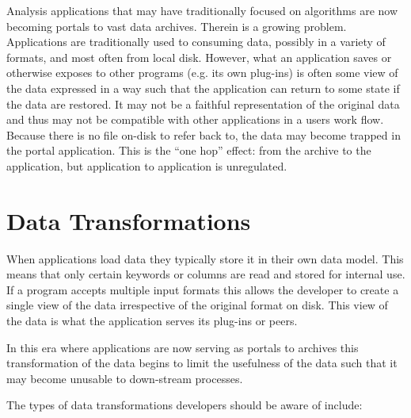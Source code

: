 Analysis applications that may have traditionally focused on algorithms are now becoming portals to vast data archives.  Therein is a growing problem.  Applications are traditionally used to consuming data, possibly in a variety of formats, and most often from local disk.  However, what an application saves or otherwise exposes to other programs (e.g. its own plug-ins) is often some view of the data expressed in a way such that the application can return to some state if the data are restored.  It may not be a faithful representation of the original data and thus may not be compatible with other applications in a users work flow.  Because there is no file on-disk to refer back to, the data may become trapped in the portal application.  This is the ``one hop'' effect:  from the archive to the application, but application to application is unregulated.


\section{Data Transformations}

When applications load data they typically store it in their own data model. This means that only certain keywords or columns are read and stored for internal use.  If a program accepts multiple input formats this allows the developer to create a single view of the data irrespective of the original format on disk.  This view of the data is what the application serves its plug-ins or peers.

In this era where applications are now serving as portals to archives this transformation of the data begins to limit the usefulness of the data such that it may become unusable to down-stream processes.

The types of data transformations developers should be aware of include:

